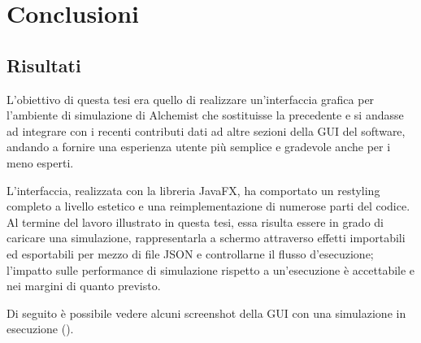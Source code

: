 

\chapter{Conclusioni}\label{ch:conclusioni}
    \section{Risultati}\label{sec:risultati}
        L'obiettivo di questa tesi era quello di realizzare un'interfaccia grafica per l'ambiente di simulazione di Alchemist che sostituisse la precedente e si andasse ad integrare con i recenti contributi dati ad altre sezioni della GUI del software, andando a fornire una esperienza utente più semplice e gradevole anche per i meno esperti.

        L'interfaccia, realizzata con la libreria JavaFX, ha comportato un restyling completo a livello estetico e una reimplementazione di numerose parti del codice.
        Al termine del lavoro illustrato in questa tesi, essa risulta essere in grado di caricare una simulazione, rappresentarla a schermo attraverso effetti importabili ed esportabili per mezzo di file JSON e controllarne il flusso d'esecuzione; l'impatto sulle performance di simulazione rispetto a un'esecuzione  è accettabile e nei margini di quanto previsto.

        Di seguito è possibile vedere alcuni screenshot della GUI con una simulazione in esecuzione ().

